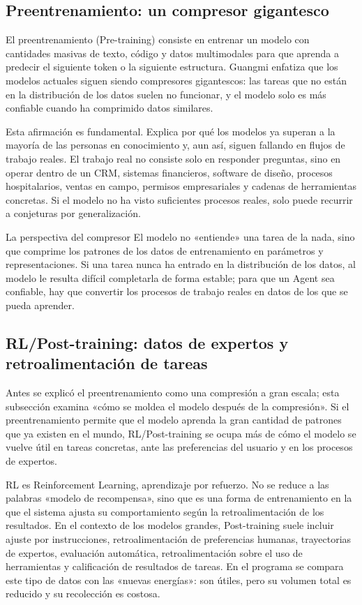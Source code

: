 \documentclass[a4paper]{article}
\begin{document}
\subsection{Preentrenamiento: un compresor gigantesco}

El preentrenamiento (Pre-training) consiste en entrenar un modelo con cantidades masivas de texto, código y datos multimodales para que aprenda a predecir el siguiente token o la siguiente estructura. Guangmi enfatiza que los modelos actuales siguen siendo compresores gigantescos: las tareas que no están en la distribución de los datos suelen no funcionar, y el modelo solo es más confiable cuando ha comprimido datos similares.

Esta afirmación es fundamental. Explica por qué los modelos ya superan a la mayoría de las personas en conocimiento y, aun así, siguen fallando en flujos de trabajo reales. El trabajo real no consiste solo en responder preguntas, sino en operar dentro de un CRM, sistemas financieros, software de diseño, procesos hospitalarios, ventas en campo, permisos empresariales y cadenas de herramientas concretas. Si el modelo no ha visto suficientes procesos reales, solo puede recurrir a conjeturas por generalización.

\begin{importantbox}{La perspectiva del compresor}
El modelo no «entiende» una tarea de la nada, sino que comprime los patrones de los datos de entrenamiento en parámetros y representaciones. Si una tarea nunca ha entrado en la distribución de los datos, al modelo le resulta difícil completarla de forma estable; para que un Agent sea confiable, hay que convertir los procesos de trabajo reales en datos de los que se pueda aprender.
\end{importantbox}

\subsection{RL/Post-training: datos de expertos y retroalimentación de tareas}

Antes se explicó el preentrenamiento como una compresión a gran escala; esta subsección examina «cómo se moldea el modelo después de la compresión». Si el preentrenamiento permite que el modelo aprenda la gran cantidad de patrones que ya existen en el mundo, RL/Post-training se ocupa más de cómo el modelo se vuelve útil en tareas concretas, ante las preferencias del usuario y en los procesos de expertos.

RL es Reinforcement Learning, aprendizaje por refuerzo. No se reduce a las palabras «modelo de recompensa», sino que es una forma de entrenamiento en la que el sistema ajusta su comportamiento según la retroalimentación de los resultados. En el contexto de los modelos grandes, Post-training suele incluir ajuste por instrucciones, retroalimentación de preferencias humanas, trayectorias de expertos, evaluación automática, retroalimentación sobre el uso de herramientas y calificación de resultados de tareas. En el programa se compara este tipo de datos con las «nuevas energías»: son útiles, pero su volumen total es reducido y su recolección es costosa.
\end{document}
